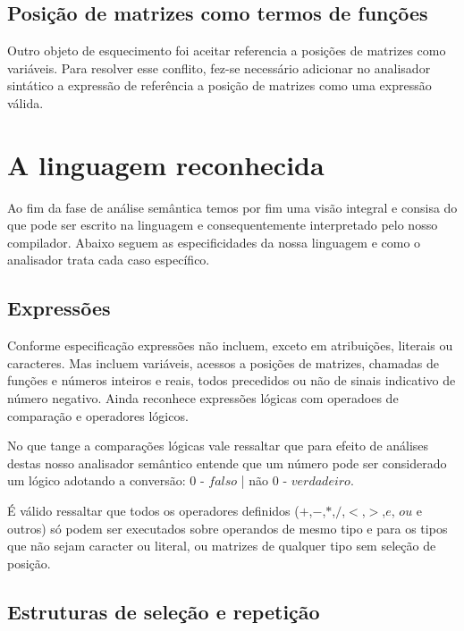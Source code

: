 \documentclass[a4paper,12pt]{report}
\begin{document}
\subsection{Posi\c{c}\~ao de matrizes como termos de fun\c{c}\~oes}

Outro objeto de esquecimento foi aceitar referencia a posi\c{c}\~oes de matrizes como 
vari\'aveis. Para resolver esse conflito, fez-se necess\'ario adicionar no analisador 
sint\'atico a express\~ao de refer\^encia a posi\c{c}\~ao de matrizes como uma express\~ao
v\'alida.

\section{A linguagem reconhecida}

Ao fim da fase de an\'alise sem\^antica temos por fim uma visão integral e consisa do que pode 
ser escrito na linguagem e consequentemente interpretado pelo nosso compilador. 
Abaixo seguem as especificidades da nossa linguagem e como o analisador
trata cada caso espec\'ifico.

\subsection{Express\~oes}

Conforme especifica\c{c}\~ao express\~oes n\~ao incluem, exceto em atribui\c{c}\~oes, literais 
ou caracteres. Mas incluem vari\'aveis, acessos a posi\c{c}\~oes de matrizes, chamadas de 
fun\c{c}\~oes e n\'umeros inteiros e reais, todos precedidos ou n\~ao de sinais indicativo de 
n\'umero negativo. Ainda reconhece express\~oes l\'ogicas com operadoes de compara\c{c}\~ao e 
operadores l\'ogicos.

No que tange a compara\c{c}\~oes l\'ogicas vale ressaltar que para efeito de an\'alises
destas nosso analisador sem\^antico entende que um n\'umero pode ser considerado um 
l\'ogico adotando a convers\~ao: 0 - $falso$ | n\~ao 0 - $verdadeiro$.

\'E v\'alido ressaltar que todos os operadores definidos ($+$,$-$,$*$,$/$,$<$,$>$,$e$, $ou$ e 
outros) s\'o podem ser executados sobre operandos de mesmo tipo e para os tipos que n\~ao sejam
caracter ou literal, ou matrizes de qualquer tipo sem sele\c{c}\~ao de posi\c{c}\~ao.

\subsection{Estruturas de sele\c{c}\~ao e repeti\c{c}\~ao}
\end{document}
